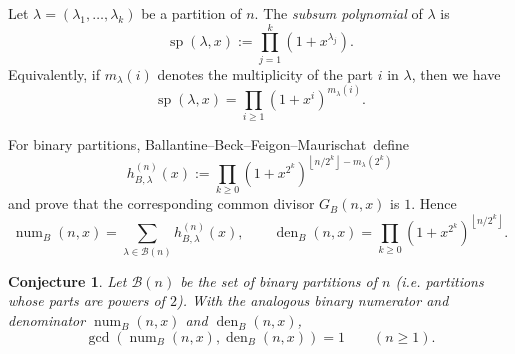\documentclass[12pt]{amsart}
\newtheorem{conjecture}{Conjecture}
\DeclareMathOperator{\spol}{sp}
\DeclareMathOperator{\num}{num}
\DeclareMathOperator{\den}{den}
\newcommand{\floor}[1]{\left\lfloor #1\right\rfloor}
\newcommand{\bbfm}{Ballantine--Beck--Feigon--Maurischat}
\newcommand{\BB}{\mathcal B}
\begin{document}
Let \(\lambda=(\lambda_1,\ldots,\lambda_k)\) be a partition of \(n\).  The
\emph{subsum polynomial} of \(\lambda\) is
\begin{equation}
   \spol(\lambda,x):=\prod_{j=1}^k(1+x^{\lambda_j}).
\end{equation}
Equivalently, if \(m_\lambda(i)\) denotes the multiplicity of the part \(i\) in
\(\lambda\), then we have
\[
   \spol(\lambda,x)=\prod_{i\ge1}(1+x^i)^{m_\lambda(i)}.
\]

For binary partitions, \bbfm\ define
\[
   h_{B,\lambda}^{(n)}(x)
   :=\prod_{k\ge0}(1+x^{2^k})^{\floor{n/2^k}-m_\lambda(2^k)}
\]
and prove that the corresponding common divisor \(G_B(n,x)\) is \(1\).  Hence
\[
   \num_B(n,x)=\sum_{\lambda\in\BB(n)}h_{B,\lambda}^{(n)}(x),
   \qquad
   \den_B(n,x)=\prod_{k\ge0}(1+x^{2^k})^{\floor{n/2^k}}.
\]

\begin{conjecture}\label{conj:conj5} Let \(\BB(n)\) be the set of binary partitions of \(n\) (i.e. partitions
whose parts are powers of \(2\)).  With the analogous binary numerator and
denominator \(\num_B(n,x)\) and \(\den_B(n,x)\),
\[
   \gcd(\num_B(n,x),\den_B(n,x))=1
   \qquad(n\ge1).
\]
\end{conjecture}
\end{document}
